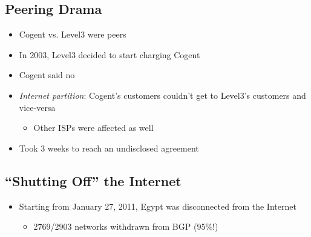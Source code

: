 \subsection{Peering Drama}
\begin{itemize}[nosep]
    \item Cogent vs. Level3 were peers
    \item In 2003, Level3 decided to start charging Cogent
    \item Cogent said no
    \item \emph{Internet partition}: Cogent's customers couldn't get to Level3's customers and vice-versa
          \begin{itemize}[nosep]
              \item Other ISPs were affected as well
          \end{itemize}
    \item Took 3 weeks to reach an undisclosed agreement
\end{itemize}

\subsection{``Shutting Off'' the Internet}
\begin{itemize}[nosep]
    \item Starting from January 27, 2011, Egypt was disconnected from the Internet
          \begin{itemize}[nosep]
              \item 2769/2903 networks withdrawn from BGP (95\%!)
          \end{itemize}
\end{itemize}